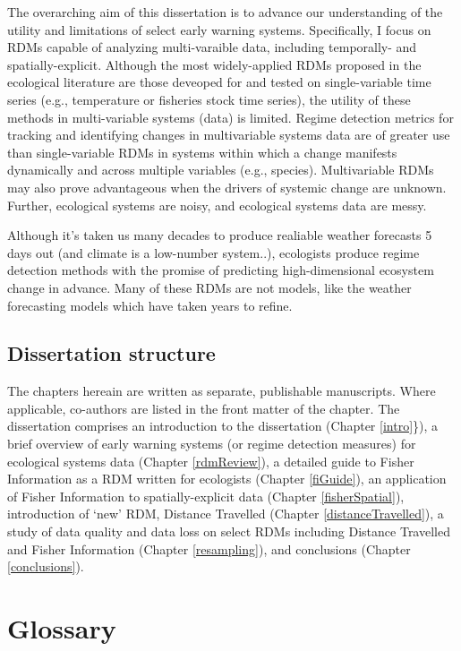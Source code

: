 \documentclass[12pt,twoside,openany]{reedthesis}
\begin{document}
The overarching aim of this dissertation is to advance our understanding
of the utility and limitations of select early warning systems.
Specifically, I focus on RDMs capable of analyzing multi-varaible data,
including temporally- and spatially-explicit. Although the most
widely-applied RDMs proposed in the ecological literature are those
deveoped for and tested on single-variable time series (e.g.,
temperature or fisheries stock time series), the utility of these
methods in multi-variable systems (data) is limited. Regime detection
metrics for tracking and identifying changes in multivariable systems
data are of greater use than single-variable RDMs in systems within
which a change manifests dynamically and across multiple variables
(e.g., species). Multivariable RDMs may also prove advantageous when the
drivers of systemic change are unknown. Further, ecological systems are
noisy, and ecological systems data are messy.

Although it's taken us many decades to produce realiable weather
forecasts 5 days out (and climate is a low-number system..), ecologists
produce regime detection methods with the promise of predicting
high-dimensional ecosystem change in advance. Many of these RDMs are not
models, like the weather forecasting models which have taken years to
refine.

\subsection{Dissertation structure}\label{dissertation-structure}

The chapters hereain are written as separate, publishable manuscripts.
Where applicable, co-authors are listed in the front matter of the
chapter. The dissertation comprises an introduction to the dissertation
(Chapter \ref{intro}\}), a brief overview of early warning systems (or
regime detection measures) for ecological systems data (Chapter
\ref{rdmReview}), a detailed guide to Fisher Information as a RDM
written for ecologists (Chapter \ref{fiGuide}), an application of Fisher
Information to spatially-explicit data (Chapter \ref{fisherSpatial}),
introduction of `new' RDM, Distance Travelled (Chapter
\ref{distanceTravelled}), a study of data quality and data loss on
select RDMs including Distance Travelled and Fisher Information (Chapter
\ref{resampling}), and conclusions (Chapter \ref{conclusions}).

\section{Glossary}\label{glossary}
\end{document}
